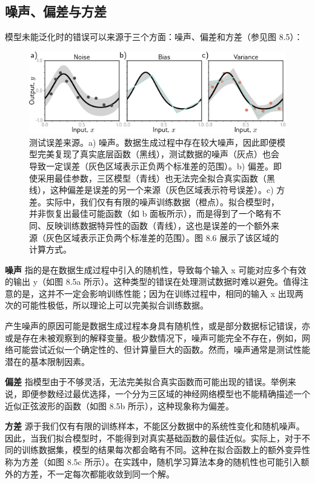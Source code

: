 \subsection{噪声、偏差与方差}
模型未能泛化时的错误可以来源于三个方面：噪声、偏差和方差（参见图 8.5）：

\begin{figure}[ht!]
\centering
\includegraphics[width=0.7\linewidth]{png/chapter8/PerfNoiseBiasVariance.png}
\caption{测试误差来源。a) 噪声。数据生成过程中存在较大噪声，因此即便模型完美复现了真实底层函数（黑线），测试数据的噪声（灰点）也会导致一定误差（灰色区域表示正负两个标准差的范围）。b) 偏差。即使采用最佳参数，三区模型（青线）也无法完全拟合真实函数（黑线），这种偏差是误差的另一个来源（灰色区域表示符号误差）。c) 方差。实际中，我们仅有有限的噪声训练数据（橙点）。拟合模型时，并非恢复出最佳可能函数（如 b 面板所示），而是得到了一个略有不同、反映训练数据特异性的函数（青线），这也是误差的一个额外来源（灰色区域表示正负两个标准差的范围）。图 8.6 展示了该区域的计算方式。}
\end{figure}


\textbf{噪声} 指的是在数据生成过程中引入的随机性，导致每个输入 x 可能对应多个有效的输出 y（如图 8.5a 所示）。这种类型的错误在处理测试数据时难以避免。值得注意的是，这并不一定会影响训练性能；因为在训练过程中，相同的输入 x 出现两次的可能性极低，所以理论上可以完美拟合训练数据。

产生噪声的原因可能是数据生成过程本身具有随机性，或是部分数据标记错误，亦或是存在未被观察到的解释变量。极少数情况下，噪声可能完全不存在，例如，网络可能尝试近似一个确定性的、但计算量巨大的函数。然而，噪声通常是测试性能潜在的基本限制因素。

\textbf{偏差} 指模型由于不够灵活，无法完美拟合真实函数而可能出现的错误。举例来说，即便参数经过最优选择，一个分为三区域的神经网络模型也不能精确描述一个近似正弦波形的函数（如图 8.5b 所示），这种现象称为偏差。

\textbf{方差} 源于我们仅有有限的训练样本，不能区分数据中的系统性变化和随机噪声。因此，当我们拟合模型时，不能得到对真实基础函数的最佳近似。实际上，对于不同的训练数据集，模型的结果每次都会略有不同。这种在拟合函数上的额外变异性称为方差（如图 8.5c 所示）。在实践中，随机学习算法本身的随机性也可能引入额外的方差，不一定每次都能收敛到同一个解。
